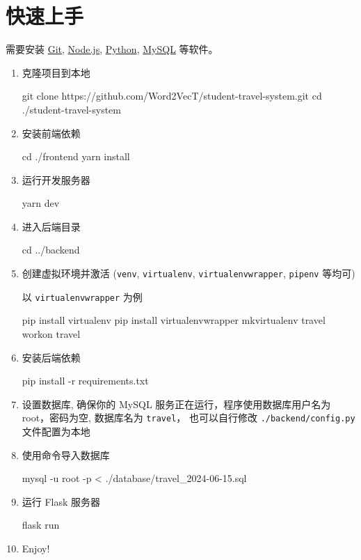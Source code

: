 \documentclass{ctexart}
\begin{document}
\section{快速上手}

需要安装 \href{https://git-scm.com/}{Git}, \href{https://nodejs.org/}{Node.js}, \href{https://www.python.org/}{Python}, \href{https://www.mysql.com/}{MySQL} 等软件。

\begin{enumerate}
    \item 克隆项目到本地 \begin{bashcode}
              git clone https://github.com/Word2VecT/student-travel-system.git
              cd ./student-travel-system
          \end{bashcode}
    \item 安装前端依赖 \begin{bashcode}
              cd ./frontend
              yarn install
          \end{bashcode}
    \item 运行开发服务器 \begin{bashcode}
              yarn dev
          \end{bashcode}
    \item 进入后端目录 \begin{bashcode}
              cd ../backend
          \end{bashcode}
    \item 创建虚拟环境并激活 (\verb|venv|, \verb|virtualenv|, \verb|virtualenvwrapper|, \verb|pipenv| 等均可)

          以 \verb|virtualenvwrapper| 为例 \begin{bashcode}
              pip install virtualenv
              pip install virtualenvwrapper
              mkvirtualenv travel
              workon travel
          \end{bashcode}
    \item 安装后端依赖 \begin{bashcode}
              pip install -r requirements.txt
          \end{bashcode}
    \item 设置数据库, 确保你的 MySQL 服务正在运行，程序使用数据库用户名为 root，密码为空, 数据库名为 \verb|travel|， 也可以自行修改 \verb|./backend/config.py| 文件配置为本地
    \item 使用命令导入数据库 \begin{bashcode}
              mysql -u root -p < ./database/travel_2024-06-15.sql
          \end{bashcode}
    \item 运行 Flask 服务器 \begin{bashcode}
              flask run
          \end{bashcode}
    \item Enjoy!
\end{enumerate}
\end{document}
